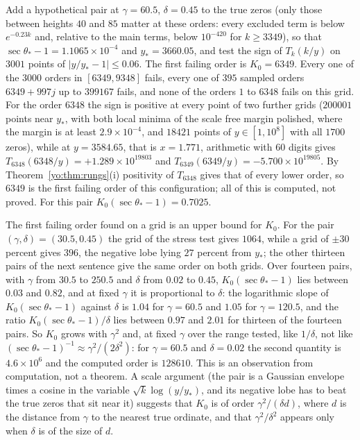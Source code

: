 \begin{remark}\label{yo:rem:stress}
Add a hypothetical pair at $\gamma=60.5$, $\delta=0.45$ to the true zeros (only those between heights $40$ and $85$ matter at these orders: every excluded term is below $e^{-0.23k}$ and, relative to the main terms, below $10^{-420}$ for $k\ge3349$), so that $\sec\theta_*-1=1.1065\times10^{-4}$ and $y_*=3660.05$, and test the sign of $T_k(k/y)$ on $3001$ points of $|y/y_*-1|\le0.06$. The first failing order is $K_0=6349$. Every one of the $3000$ orders in $[6349,9348]$ fails, every one of $395$ sampled orders $6349+997j$ up to $399167$ fails, and none of the orders $1$ to $6348$ fails on this grid. For the order $6348$ the sign is positive at every point of two further grids ($200001$ points near $y_*$, with both local minima of the scale free margin polished, where the margin is at least $2.9\times10^{-4}$, and $18421$ points of $y\in[1,10^8]$ with all $1700$ zeros), while at $y=3584.65$, that is $x=1.771$, arithmetic with $60$ digits gives $T_{6348}(6348/y)=+1.289\times10^{19803}$ and $T_{6349}(6349/y)=-5.700\times10^{19805}$. By Theorem~\ref{yo:thm:rungs}(i) positivity of $T_{6348}$ gives that of every lower order, so $6349$ is the first failing order of this configuration; all of this is computed, not proved. For this pair $K_0(\sec\theta_*-1)=0.7025$.
\end{remark}

The first failing order found on a grid is an upper bound for $K_0$. For the pair $(\gamma,\delta)=(30.5,0.45)$ the grid of the stress test gives $1064$, while a grid of $\pm30$ percent gives $396$, the negative lobe lying $27$ percent from $y_*$; the other thirteen pairs of the next sentence give the same order on both grids. Over fourteen pairs, with $\gamma$ from $30.5$ to $250.5$ and $\delta$ from $0.02$ to $0.45$, $K_0(\sec\theta_*-1)$ lies between $0.03$ and $0.82$, and at fixed $\gamma$ it is proportional to $\delta$: the logarithmic slope of $K_0(\sec\theta_*-1)$ against $\delta$ is $1.04$ for $\gamma=60.5$ and $1.05$ for $\gamma=120.5$, and the ratio $K_0(\sec\theta_*-1)/\delta$ lies between $0.97$ and $2.01$ for thirteen of the fourteen pairs. So $K_0$ grows with $\gamma^2$ and, at fixed $\gamma$ over the range tested, like $1/\delta$, not like $(\sec\theta_*-1)^{-1}\approx\gamma^2/(2\delta^2)$: for $\gamma=60.5$ and $\delta=0.02$ the second quantity is $4.6\times10^6$ and the computed order is $128610$. This is an observation from computation, not a theorem. A scale argument (the pair is a Gaussian envelope times a cosine in the variable $\sqrt k\log(y/y_*)$, and its negative lobe has to beat the true zeros that sit near it) suggests that $K_0$ is of order $\gamma^2/(\delta d)$, where $d$ is the distance from $\gamma$ to the nearest true ordinate, and that $\gamma^2/\delta^2$ appears only when $\delta$ is of the size of $d$.

